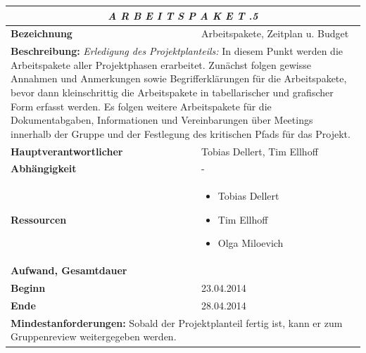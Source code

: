 \documentclass[fontsize=12pt,paper=a4,twoside]{scrartcl}
\begin{document}
\begin{tabular}{p{7.5cm}|p{7.5cm}}\toprule
\multicolumn{2}{c}{\textbf{\textit{A R B E I T S P A K E T \quad 1.1.5}}} \\ \toprule \hline
\textbf{Bezeichnung} & Arbeitspakete, Zeitplan u. Budget\\\hline
\multicolumn{2}{p{15cm}}{\textbf{Beschreibung:} \newline 
\textit{Erledigung des Projektplanteils:} In diesem Punkt werden die Arbeitspakete aller Projektphasen erarbeitet. Zunächst folgen gewisse Annahmen und Anmerkungen sowie Begrifferklärungen für die Arbeitspakete, bevor dann kleinschrittig die Arbeitspakete in tabellarischer und grafischer Form erfasst werden. Es folgen weitere Arbeitspakete für die Dokumentabgaben, Informationen und Vereinbarungen über Meetings innerhalb der Gruppe und der Festlegung des kritischen Pfads für das Projekt.}  \\\hline
\textbf{Hauptverantwortlicher} & Tobias Dellert, Tim Ellhoff \\\hline
\textbf{Abhängigkeit} & -\\\hline
\textbf{Ressourcen} & \begin{itemize}
\itemsep0pt
\item Tobias Dellert
\item Tim Ellhoff
\item Olga Miloevich
\end{itemize} \\\hline
\textbf{Aufwand, Gesamtdauer} & \\\hline
\textbf{Beginn} & 23.04.2014 \\\hline
\textbf{Ende} & 28.04.2014\\\hline
\multicolumn{2}{p{15cm}}{\textbf{Mindestanforderungen: } \newline
Sobald der Projektplanteil fertig ist, kann er zum Gruppenreview weitergegeben werden. }  \\ \toprule
\end{tabular} \\\\
\end{document}

